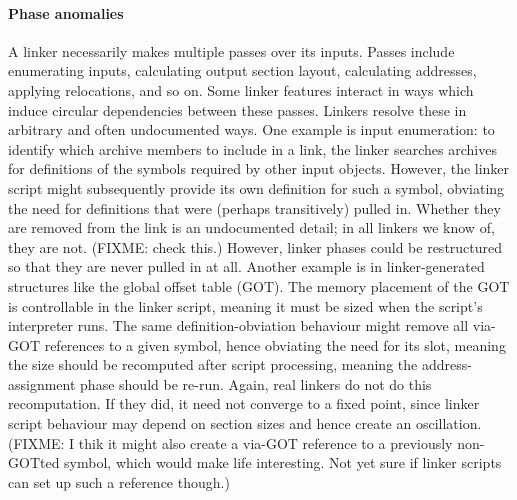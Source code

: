 \paragraph{Phase anomalies} 
A linker necessarily makes multiple passes over its inputs.
Passes include enumerating inputs, calculating output section layout, 
calculating addresses, applying relocations, and so on.
Some linker features interact in ways which induce circular dependencies between
these passes. 
Linkers resolve these in arbitrary and often undocumented ways.
One example is input enumeration: to identify which archive members
to include in a link, the linker searches archives for definitions
of the symbols required by other input objects.
However, the linker script might subsequently provide its own definition
for such a symbol, obviating the need for definitions that were (perhaps transitively) pulled in.
Whether they are removed from the link is an undocumented detail; 
in all linkers we know of, they are not. (FIXME: check this.)
However, linker phases could be restructured so that they are never pulled in at all.
Another example is in linker-generated structures like the global offset table (GOT). 
The memory placement of the GOT is controllable in the linker script,
meaning it must be sized when the script's interpreter runs. 
The same definition-obviation behaviour might remove all via-GOT references
to a given symbol, hence obviating the need for its slot, meaning the size
should be recomputed after script processing, meaning the address-assignment phase
should be re-run. 
Again, real linkers do not do this recomputation.
If they did, it need not converge to a fixed point, since linker script behaviour
may depend on section sizes and hence create an oscillation.
(FIXME: I thik it might also create a via-GOT reference
to a previously non-GOTted symbol, which would make life interesting.
Not yet sure if linker scripts can set up such a reference though.)

